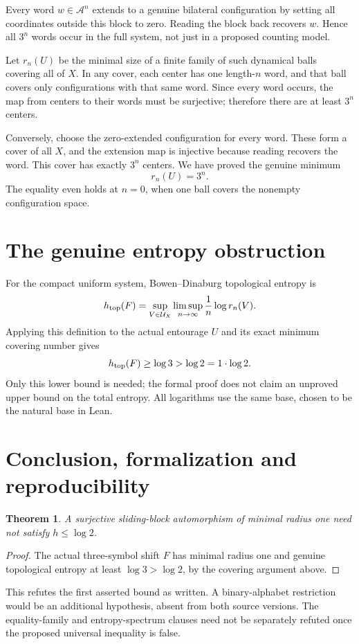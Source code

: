 \documentclass[11pt]{article}
\newtheorem{theorem}{Theorem}
\begin{document}
Every word $w\in\mathcal A^n$ extends to a genuine
bilateral configuration by setting all coordinates
outside this block to zero. Reading the block back
recovers $w$. Hence all $3^n$ words occur in the
full system, not just in a proposed counting model.

Let $r_n(U)$ be the minimal size of a finite family
of such dynamical balls covering all of $X$.
In any cover, each center has one length-$n$ word,
and that ball covers only configurations with that
same word. Since every word occurs, the map from
centers to their words must be surjective; therefore
there are at least $3^n$ centers.

Conversely, choose the zero-extended configuration
for every word. These form a cover of all $X$,
and the extension map is injective because reading
recovers the word. This cover has exactly $3^n$
centers. We have proved the genuine minimum
\[
                             r_n(U)=3^n.
\]
The equality even holds at $n=0$, when one ball
covers the nonempty configuration space.

\section*{The genuine entropy obstruction}
For the compact uniform system, Bowen--Dinaburg
topological entropy is
\[
 h_{\rm top}(F)=\sup_{V\in\mathcal U_X}
       \limsup_{n\to\infty}\frac1n\log r_n(V).
\]
Applying this definition to the actual entourage $U$
and its exact minimum covering number gives
\[
           h_{\rm top}(F)\geq\log3>\log2=1\cdot\log2.
\]
Only this lower bound is needed; the formal proof
does not claim an unproved upper bound on the
total entropy. All logarithms use the same base,
chosen to be the natural base in Lean.

\newpage
\section*{Conclusion, formalization and reproducibility}
\begin{theorem}
A surjective sliding-block automorphism of minimal
radius one need not satisfy $h\leq\log2$.
\end{theorem}
\begin{proof}
The actual three-symbol shift $F$ has minimal radius
one and genuine topological entropy at least
$\log3>\log2$, by the covering argument above.
\end{proof}
This refutes the first asserted bound as written.
A binary-alphabet restriction would be an additional
hypothesis, absent from both source versions.
The equality-family and entropy-spectrum clauses
need not be separately refuted once the proposed
universal inequality is false.
\end{document}

